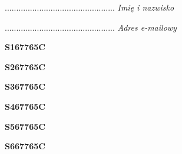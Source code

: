 \begin{turn}{90}\begin{minipage}{\linewidth} \vspace{20mm} ................................................  \textit{Imię i nazwisko}\end{minipage}\end{turn}

\begin{turn}{90}\begin{minipage}{\linewidth} \vspace{20mm} ................................................  \textit{Adres e-mailowy}\end{minipage}\end{turn}

\begin{turn}{90}\huge \begin{minipage}{\linewidth} \vspace{10mm}\textbf{S167765C}\end{minipage}\end{turn}

\begin{turn}{90}\huge \begin{minipage}{\linewidth} \vspace{10mm}\textbf{S267765C}\end{minipage}\end{turn}

\begin{turn}{90}\huge \begin{minipage}{\linewidth} \vspace{10mm}\textbf{S367765C}\end{minipage}\end{turn}

\begin{turn}{90}\huge \begin{minipage}{\linewidth} \vspace{10mm}\textbf{S467765C}\end{minipage}\end{turn}

\begin{turn}{90}\huge \begin{minipage}{\linewidth} \vspace{10mm}\textbf{S567765C}\end{minipage}\end{turn}

\begin{turn}{90}\huge \begin{minipage}{\linewidth} \vspace{10mm}\textbf{S667765C}\end{minipage}\end{turn}

